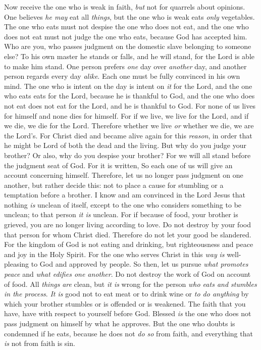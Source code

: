 \begin{biblechapter} %
 Now receive the one who is weak in faith, \textit{but} not for quarrels about opinions.
\verse One believes \textit{he may} eat all \textit{things}, but the one who is weak eats \textit{only} vegetables.
\verse The one who eats must not despise the one who does not eat, and the one who does not eat must not judge the one who eats, because God has accepted him.
\verse Who are you, who passes judgment on the domestic slave belonging to someone else? To his own master he stands or falls, and he will stand, for the Lord is able to make him stand.
\verse One person prefers \textit{one} day over \textit{another} day, and another person regards every day \textit{alike}. Each one must be fully convinced in his own mind.
\verse The one who is intent on the day is intent on \textit{it} for the Lord, and the one who eats eats for the Lord, because he is thankful to God, and the one who does not eat does not eat for the Lord, and he is thankful to God.
\verse For none of us lives for himself and none dies for himself.
\verse For if we live, we live for the Lord, and if we die, we die for the Lord. Therefore whether we live \textit{or} whether we die, we are the Lord’s.
\verse For Christ died and became alive again for this \textit{reason}, in order that he might be Lord of both the dead and the living.
\verse But why do you judge your brother? Or also, why do you despise your brother? For we will all stand before the judgment seat of God.
\verse For it is written,
\verse So each one of us will give an account concerning himself.
\verse Therefore, let us no longer pass judgment on one another, but rather decide this: not to place a cause for stumbling or a temptation before a brother.
\verse I know and am convinced in the Lord Jesus that nothing \textit{is} unclean of itself, except to the one who considers something to be unclean; to that person \textit{it is} unclean.
\verse For if because of food, your brother is grieved, you are no longer living according to love. Do not destroy by your food that person for whom Christ died.
\verse Therefore do not let your good be slandered.
\verse For the kingdom of God is not eating and drinking, but righteousness and peace and joy in the Holy Spirit.
\verse For the one who serves Christ in this \textit{way} \textit{is} well-pleasing to God and approved by people.
\verse So then, let us pursue \textit{what promotes peace} and \textit{what edifies one another}.
\verse Do not destroy the work of God on account of food. All \textit{things} \textit{are} clean, but \textit{it is} wrong for the person \textit{who eats and stumbles in the process}.
\verse \textit{It is} good not to eat meat or to drink wine or \textit{to do anything} by which your brother stumbles or is offended or is weakened.
\verse The faith that you have, have with respect to yourself before God. Blessed \textit{is} the one who does not pass judgment on himself by what he approves.
\verse But the one who doubts is condemned if he eats, because he does not \textit{do so} from faith, and everything that \textit{is} not from faith is sin.
\end{biblechapter}

